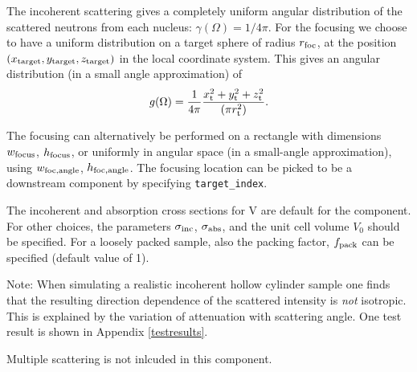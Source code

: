 The incoherent scattering gives
a completely uniform angular distribution of the scattered
neutrons from each nucleus: $\gamma(\Omega) = 1/4\pi$.
For the focusing we choose to have a uniform distribution on
a target sphere of radius $r_{\rm foc}$, at the position
$(x_{\rm target},y_{\rm target},z_{\rm target})$
in the local coordinate system.
This gives an angular distribution (in a small angle approximation)
of
\begin{equation}
g(\Omega) = \frac{1}{4\pi}
  \frac{x_{\rm t}^2+y_{\rm t}^2+z_{\rm t}^2}{(\pi r_{\rm t}^2)}.
\end{equation}

The focusing can alternatively be performed on a rectangle with dimensions
$w_{\rm focus}$, $h_{\rm focus}$, or uniformly in angular space
(in a small-angle approximation),
using $w_{\rm foc, angle}$, $h_{\rm foc, angle}$.
The focusing location can be picked to be a downstream component by
specifying \verb+target_index+.

The incoherent and absorption cross sections for V are default
for the component. For other choices, the
parameters $\sigma_{\rm inc}$, $\sigma_{\rm abs}$,
and the unit cell volume $V_0$ should be specified.
For a loosely packed sample, also the packing factor, $f_{\rm pack}$
can be specified (default value of 1).

Note: When simulating a realistic incoherent hollow cylinder sample
one finds that  the resulting direction dependence
of the scattered intensity is {\em not} isotropic.
This is explained by the variation of attenuation with
scattering angle.
One test result is shown in Appendix \ref{testresults}.

Multiple scattering is not inlcuded in this component.